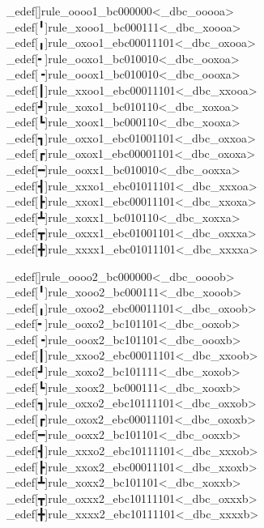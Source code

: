 \brl@char_edef[]{rule_oooo1}{\brl@char_bc000000}<\brl@char@alias_dbc_ooooa>
\brl@char_edef[╹]{rule_xooo1}{\brl@char_bc000111}<\brl@char@alias_dbc_xoooa>
\brl@char_edef[╻]{rule_oxoo1}{\brl@char_ebc00011101}<\brl@char@alias_dbc_oxooa>
\brl@char_edef[╸]{rule_ooxo1}{\brl@char_bc010010}<\brl@char@alias_dbc_ooxoa>
\brl@char_edef[╺]{rule_ooox1}{\brl@char_bc010010}<\brl@char@alias_dbc_oooxa>
\brl@char_edef[┃]{rule_xxoo1}{\brl@char_ebc00011101}<\brl@char@alias_dbc_xxooa>
\brl@char_edef[┛]{rule_xoxo1}{\brl@char_bc010110}<\brl@char@alias_dbc_xoxoa>
\brl@char_edef[┗]{rule_xoox1}{\brl@char_bc000110}<\brl@char@alias_dbc_xooxa>
\brl@char_edef[┓]{rule_oxxo1}{\brl@char_ebc01001101}<\brl@char@alias_dbc_oxxoa>
\brl@char_edef[┏]{rule_oxox1}{\brl@char_ebc00001101}<\brl@char@alias_dbc_oxoxa>
\brl@char_edef[━]{rule_ooxx1}{\brl@char_bc010010}<\brl@char@alias_dbc_ooxxa>
\brl@char_edef[┫]{rule_xxxo1}{\brl@char_ebc01011101}<\brl@char@alias_dbc_xxxoa>
\brl@char_edef[┣]{rule_xxox1}{\brl@char_ebc00011101}<\brl@char@alias_dbc_xxoxa>
\brl@char_edef[┻]{rule_xoxx1}{\brl@char_bc010110}<\brl@char@alias_dbc_xoxxa>
\brl@char_edef[┳]{rule_oxxx1}{\brl@char_ebc01001101}<\brl@char@alias_dbc_oxxxa>
\brl@char_edef[╋]{rule_xxxx1}{\brl@char_ebc01011101}<\brl@char@alias_dbc_xxxxa>

\brl@char_edef[]{rule_oooo2}{\brl@char_bc000000}<\brl@char@alias_dbc_oooob>
\brl@char_edef[╹]{rule_xooo2}{\brl@char_bc000111}<\brl@char@alias_dbc_xooob>
\brl@char_edef[╻]{rule_oxoo2}{\brl@char_ebc00011101}<\brl@char@alias_dbc_oxoob>
\brl@char_edef[╸]{rule_ooxo2}{\brl@char_bc101101}<\brl@char@alias_dbc_ooxob>
\brl@char_edef[╺]{rule_ooox2}{\brl@char_bc101101}<\brl@char@alias_dbc_oooxb>
\brl@char_edef[┃]{rule_xxoo2}{\brl@char_ebc00011101}<\brl@char@alias_dbc_xxoob>
\brl@char_edef[┛]{rule_xoxo2}{\brl@char_bc101111}<\brl@char@alias_dbc_xoxob>
\brl@char_edef[┗]{rule_xoox2}{\brl@char_bc000111}<\brl@char@alias_dbc_xooxb>
\brl@char_edef[┓]{rule_oxxo2}{\brl@char_ebc10111101}<\brl@char@alias_dbc_oxxob>
\brl@char_edef[┏]{rule_oxox2}{\brl@char_ebc00011101}<\brl@char@alias_dbc_oxoxb>
\brl@char_edef[━]{rule_ooxx2}{\brl@char_bc101101}<\brl@char@alias_dbc_ooxxb>
\brl@char_edef[┫]{rule_xxxo2}{\brl@char_ebc10111101}<\brl@char@alias_dbc_xxxob>
\brl@char_edef[┣]{rule_xxox2}{\brl@char_ebc00011101}<\brl@char@alias_dbc_xxoxb>
\brl@char_edef[┻]{rule_xoxx2}{\brl@char_bc101101}<\brl@char@alias_dbc_xoxxb>
\brl@char_edef[┳]{rule_oxxx2}{\brl@char_ebc10111101}<\brl@char@alias_dbc_oxxxb>
\brl@char_edef[╋]{rule_xxxx2}{\brl@char_ebc10111101}<\brl@char@alias_dbc_xxxxb>

